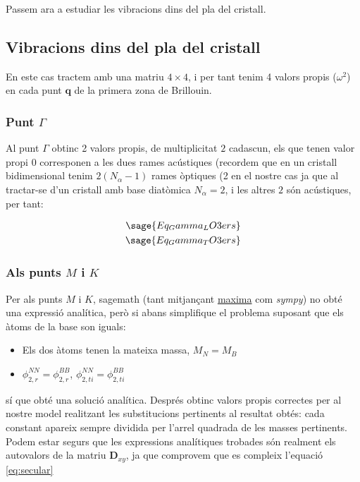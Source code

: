 \documentclass[12pt]{article} %
\let\vec\mathbf %
\begin{document}
Passem ara a estudiar les vibracions dins del pla del cristall.

\subsection{Vibracions dins del pla del cristall}

En este cas tractem amb una matriu $4\times 4$, i per tant tenim 4 valors propis ($\omega^2$) en cada punt $\vec q$ de la primera zona de Brillouin.


\subsubsection{Punt $\Gamma$}

Al punt $\Gamma$ obtinc 2 valors propis, de multiplicitat $2$ cadascun, els que tenen valor propi $0$ corresponen a les dues rames acústiques (recordem que en un cristall bidimensional tenim $2(N_\alpha -1)$ rames òptiques (2 en el nostre cas ja que al tractar-se d'un cristall amb base diatòmica $N_\alpha=2$, i les altres $2$ són acústiques, per tant: 

\begin{equation}
 \begin{split}
\sage{Eq_Gamma_LO3ers}\\
\sage{Eq_Gamma_TO3ers}
 \end{split}
\end{equation}

\subsubsection{Als punts $M$ i $K$}

Per als punts $M$ i $K$, sagemath (tant mitjançant \href{https://maxima.sourceforge.io/}{maxima} com \textit{sympy}) no obté una expressió analítica, però si abans simplifique el problema suposant que els àtoms de la base son iguals:

\begin{itemize}

\item Els dos àtoms tenen la mateixa massa, $M_N=M_B$
\item  $\phi_{2,r}^{NN}=\phi_{2,r}^{BB}$, $\phi_{2,ti}^{NN}=\phi_{2,ti}^{BB}$ 
\end{itemize}

sí que obté una solució analítica. Després obtinc valors propis correctes per al nostre model realitzant les substitucions pertinents al resultat obtés: cada constant apareix sempre dividida per l'arrel quadrada de les masses pertinents.
Podem estar segurs que les expressions analítiques trobades són  realment els autovalors de la matriu $\vec D_{xy}$, ja que comprovem que es compleix l'equació \ref{eq:secular}
\end{document}
